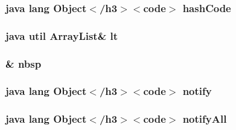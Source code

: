 \hypertarget{_connection_8html_a8e178e2bb2bef055ea23ea3910a221ca}{
\subsubsection[{hash\-Code}]{\setlength{\rightskip}{0pt plus 5cm}java lang Object$<$/h3$>$$<$code$>$ hash\-Code}}\label{_connection_8html_a8e178e2bb2bef055ea23ea3910a221ca}
\hypertarget{_connection_8html_a6046ea68583de5557b637104e82142fd}{
\subsubsection[{lt}]{\setlength{\rightskip}{0pt plus 5cm}java util Array\-List\& lt}}\label{_connection_8html_a6046ea68583de5557b637104e82142fd}
\hypertarget{_connection_8html_aef915316f784c9063d942974538301a6}{
\subsubsection[{nbsp}]{\setlength{\rightskip}{0pt plus 5cm}\& nbsp}}\label{_connection_8html_aef915316f784c9063d942974538301a6}
\hypertarget{_connection_8html_ae99ae10b5010594dbda4794e02db271b}{
\subsubsection[{notify}]{\setlength{\rightskip}{0pt plus 5cm}java lang Object$<$/h3$>$$<$code$>$ notify}}\label{_connection_8html_ae99ae10b5010594dbda4794e02db271b}
\hypertarget{_connection_8html_a1279357e6e09e33e75b55eb05fdb6436}{
\subsubsection[{notify\-All}]{\setlength{\rightskip}{0pt plus 5cm}java lang Object$<$/h3$>$$<$code$>$ notify\-All}}\label{_connection_8html_a1279357e6e09e33e75b55eb05fdb6436}
